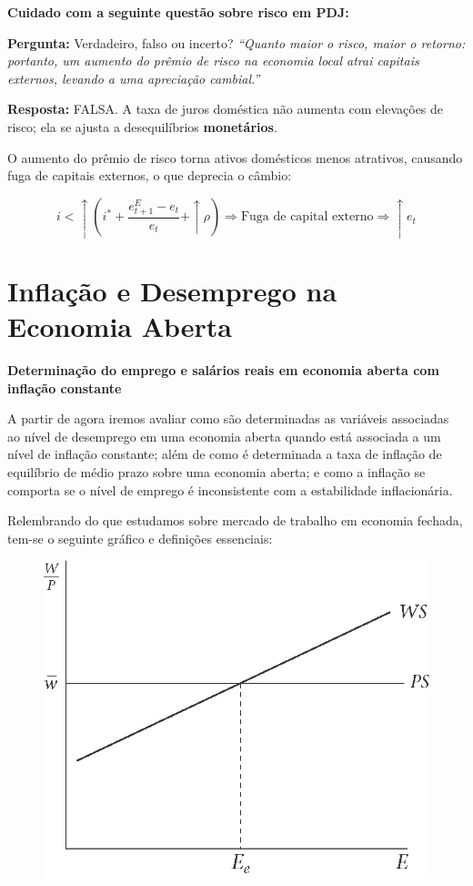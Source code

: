 \documentclass[a4paper,12pt]{article}[abntex2]
\begin{document}
\textbf{Cuidado com a seguinte questão sobre risco em PDJ:}

\textbf{Pergunta:} Verdadeiro, falso ou incerto?  
\textit{“Quanto maior o risco, maior o retorno: portanto, um aumento do prêmio de risco na economia local atrai capitais externos, levando a uma apreciação cambial.”}

\textbf{Resposta:} FALSA.  
A taxa de juros doméstica não aumenta com elevações de risco; ela se ajusta a desequilíbrios \textbf{monetários}.  

O aumento do prêmio de risco torna ativos domésticos menos atrativos, causando fuga de capitais externos, o que deprecia o câmbio:

\[
i < \uparrow \left( i^* + \frac{e^E_{t+1} - e_t}{e_t} + \uparrow \rho \right)
\Rightarrow \text{Fuga de capital externo} \Rightarrow \uparrow e_t
\]

\newpage
\section{\textbf{Inflação e Desemprego na Economia Aberta}}
\textbf{Determinação do emprego e salários reais em economia aberta com inflação constante}

A partir de agora iremos avaliar como são determinadas as variáveis associadas ao nível de desemprego em uma economia aberta quando está associada a um nível de inflação constante; além de como é determinada a taxa de inflação de equilíbrio de médio prazo sobre uma economia aberta; e como a inflação se comporta se o nível de emprego é inconsistente com a estabilidade inflacionária.

Relembrando do que estudamos sobre mercado de trabalho em economia fechada, tem-se o seguinte gráfico e definições essenciais:

\begin{figure}[H]
    \centering
    \includegraphics[width=0.7\linewidth]{Imagens/a24i4.png}
\end{figure}
\end{document}
